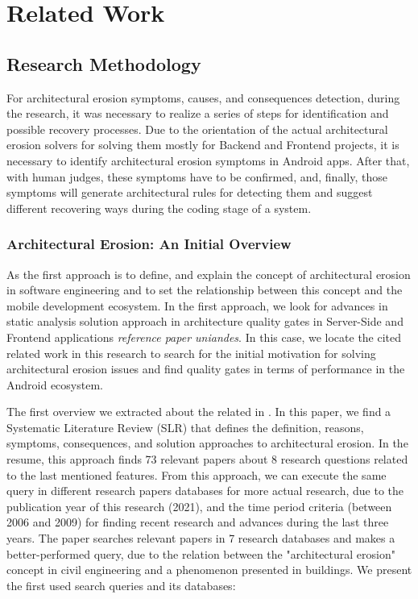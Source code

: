 \chapter{Related Work}
\label{cha:relatedwork}

\section{Research Methodology}
For architectural erosion symptoms, causes, and consequences detection, during the research, it was necessary to realize a series of steps for identification and possible recovery processes. Due to the orientation of the actual architectural erosion solvers for solving them mostly for Backend and Frontend projects, it is necessary to identify architectural erosion symptoms in Android apps. After that, with human judges, these symptoms have to be confirmed, and, finally, those symptoms will generate architectural rules for detecting them and suggest different recovering ways during the coding stage of a system.

\subsection{Architectural Erosion: An Initial Overview}
As the first approach is to define, and explain the concept of architectural erosion in software engineering and to set the relationship between this concept and the mobile development ecosystem. In the first approach, we look for advances in static analysis solution approach in architecture quality gates in Server-Side and Frontend applications \emph{reference paper uniandes}. In this case, we locate the cited related work in this research to search for the initial motivation for solving architectural erosion issues and find quality gates in terms of performance in the Android ecosystem.

The first overview we extracted about the related in \citet{slr-base}. In this paper, we find a Systematic Literature Review (SLR) that defines the definition, reasons, symptoms, consequences, and solution approaches to architectural erosion. In the resume, this approach finds 73 relevant papers about 8 research questions related to the last mentioned features. From this approach, we can execute the same query in different research papers databases for more actual research, due to the publication year of this research (2021), and the time period criteria (between 2006 and 2009) for finding recent research and advances during the last three years. The paper searches relevant papers in 7 research databases and makes a better-performed query, due to the relation between the "architectural erosion" concept in civil engineering and a phenomenon presented in buildings. We present the first used search queries and its databases:

